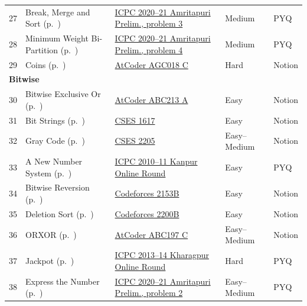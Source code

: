 {\begin{longtable}{r >{\raggedright\arraybackslash}p{4.6cm} >{\raggedright\arraybackslash}p{5.6cm} l l}
27 & Break, Merge and Sort (p.~\pageref{sec:g-break-merge}) & \href{https://github.com/m-e-r-l-i-n/icpc-india/blob/main/src/ICPC\%202020\%20-\%20India\%20Prelims\%20Solutions.pdf}{ICPC 2020--21 Amritapuri Prelim., problem 3} & Medium & PYQ\\
28 & Minimum Weight Bi-Partition (p.~\pageref{sec:g-min-bipartition}) & \href{https://github.com/m-e-r-l-i-n/icpc-india/blob/main/src/ICPC\%202020\%20-\%20India\%20Prelims\%20Solutions.pdf}{ICPC 2020--21 Amritapuri Prelim., problem 4} & Medium & PYQ\\
29 & Coins (p.~\pageref{sec:g-coins}) & \href{https://atcoder.jp/contests/agc018/tasks/agc018_c}{AtCoder AGC018 C} & Hard & Notion\\
\multicolumn{5}{l}{\textbf{Bitwise}}\\
30 & Bitwise Exclusive Or (p.~\pageref{sec:b-xor-basic}) & \href{https://atcoder.jp/contests/abc213/tasks/abc213_a}{AtCoder ABC213 A} & Easy & Notion\\
31 & Bit Strings (p.~\pageref{sec:b-bit-strings}) & \href{https://cses.fi/problemset/task/1617}{CSES 1617} & Easy & Notion\\
32 & Gray Code (p.~\pageref{sec:b-gray}) & \href{https://cses.fi/problemset/task/2205}{CSES 2205} & Easy--Medium & Notion\\
33 & A New Number System (p.~\pageref{sec:b-new-number}) & \href{https://github.com/m-e-r-l-i-n/icpc-india/blob/main/src/2010problemset_kanpur_online.pdf}{ICPC 2010--11 Kanpur Online Round} & Easy & PYQ\\
34 & Bitwise Reversion (p.~\pageref{sec:b-reversion}) & \href{https://codeforces.com/problemset/problem/2153/B}{Codeforces 2153B} & Easy & Notion\\
35 & Deletion Sort (p.~\pageref{sec:b-deletion-sort}) & \href{https://codeforces.com/problemset/problem/2200/B}{Codeforces 2200B} & Easy & Notion\\
36 & ORXOR (p.~\pageref{sec:b-orxor}) & \href{https://atcoder.jp/contests/abc197/tasks/abc197_c}{AtCoder ABC197 C} & Easy--Medium & Notion\\
37 & Jackpot (p.~\pageref{sec:b-jackpot}) & \href{https://github.com/m-e-r-l-i-n/icpc-india/blob/main/src/Kharagpur_Site_Online_Problems_2013.pdf}{ICPC 2013--14 Kharagpur Online Round} & Hard & PYQ\\
38 & Express the Number (p.~\pageref{sec:b-express}) & \href{https://github.com/m-e-r-l-i-n/icpc-india/blob/main/src/ICPC\%202020\%20-\%20India\%20Prelims\%20Solutions.pdf}{ICPC 2020--21 Amritapuri Prelim., problem 2} & Easy--Medium & PYQ\\

\end{longtable}}
